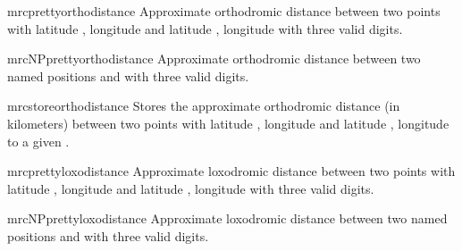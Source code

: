 \begin{docCommand}{mrcprettyorthodistance}{}
  Approximate orthodromic distance between two points
  with latitude , longitude 
  and latitude , longitude 
  with three valid digits.
  \begin{dispExample}
  \end{dispExample}
\end{docCommand}


\begin{docCommand}{mrcNPprettyorthodistance}{}
  Approximate orthodromic distance between two named positions
   and  with three valid digits.
  \begin{dispExample}
  \end{dispExample}
\end{docCommand}


\begin{docCommand}{mrcstoreorthodistance}{}
  Stores the approximate orthodromic distance (in kilometers) between two points
  with latitude , longitude 
  and latitude , longitude 
  to a given .
  \begin{dispExample}
  \mrcstoreorthodistance{}
  \mydist
  \end{dispExample}
\end{docCommand}


\begin{docCommand}{mrcprettyloxodistance}{}
  Approximate loxodromic distance between two points
  with latitude , longitude 
  and latitude , longitude 
  with three valid digits.
  \begin{dispExample}
  \end{dispExample}
\end{docCommand}


\begin{docCommand}{mrcNPprettyloxodistance}{}
  Approximate loxodromic distance between two named positions
   and  with three valid digits.
  \begin{dispExample}
  \end{dispExample}
\end{docCommand}

